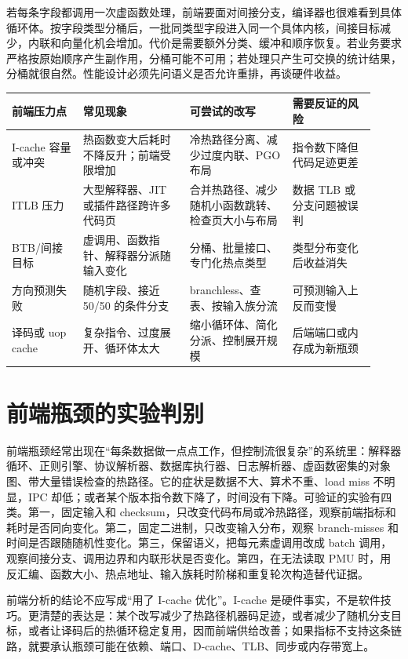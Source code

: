 若每条字段都调用一次虚函数处理，前端要面对间接分支，编译器也很难看到具体循环体。按字段类型分桶后，一批同类型字段进入同一个具体内核，间接目标减少，内联和向量化机会增加。代价是需要额外分类、缓冲和顺序恢复。若业务要求严格按原始顺序产生副作用，分桶可能不可用；若处理只产生可交换的统计结果，分桶就很自然。性能设计必须先问语义是否允许重排，再谈硬件收益。

\begin{center}
\small
\begin{tabular}{@{}p{0.18\linewidth}p{0.27\linewidth}p{0.26\linewidth}p{0.21\linewidth}@{}}
\toprule
前端压力点 & 常见现象 & 可尝试的改写 & 需要反证的风险 \\
\midrule
I-cache 容量或冲突 & 热函数变大后耗时不降反升；前端受限增加 & 冷热路径分离、减少过度内联、PGO 布局 & 指令数下降但代码足迹更差 \\
ITLB 压力 & 大型解释器、JIT 或插件路径跨许多代码页 & 合并热路径、减少随机小函数跳转、检查页大小与布局 & 数据 TLB 或分支问题被误判 \\
BTB/间接目标 & 虚调用、函数指针、解释器分派随输入变化 & 分桶、批量接口、专门化热点类型 & 类型分布变化后收益消失 \\
方向预测失败 & 随机字段、接近 50/50 的条件分支 & branchless、查表、按输入族分流 & 可预测输入上反而变慢 \\
译码或 uop cache & 复杂指令、过度展开、循环体太大 & 缩小循环体、简化分派、控制展开规模 & 后端端口或内存成为新瓶颈 \\
\bottomrule
\end{tabular}
\end{center}

\section{前端瓶颈的实验判别}

前端瓶颈经常出现在“每条数据做一点点工作，但控制流很复杂”的系统里：解释器循环、正则引擎、协议解析器、数据库执行器、日志解析器、虚函数密集的对象图、带大量错误检查的热路径。它的症状是数据不大、算术不重、load miss 不明显，IPC 却低；或者某个版本指令数下降了，时间没有下降。可验证的实验有四类。第一，固定输入和 checksum，只改变代码布局或冷热路径，观察前端指标和耗时是否同向变化。第二，固定二进制，只改变输入分布，观察 branch-misses 和时间是否跟随随机性变化。第三，保留语义，把每元素虚调用改成 batch 调用，观察间接分支、调用边界和内联形状是否变化。第四，在无法读取 PMU 时，用反汇编、函数大小、热点地址、输入族耗时阶梯和重复轮次构造替代证据。

前端分析的结论不应写成“用了 I-cache 优化”。I-cache 是硬件事实，不是软件技巧。更清楚的表达是：某个改写减少了热路径机器码足迹，或者减少了随机分支目标，或者让译码后的热循环稳定复用，因而前端供给改善；如果指标不支持这条链路，就要承认瓶颈可能在依赖、端口、D-cache、TLB、同步或内存带宽上。

